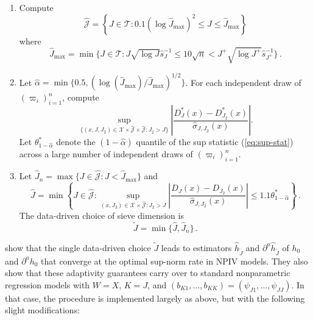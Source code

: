 \documentclass[
]{jss}
\begin{document}
\begin{enumerate}
\item Compute 
\begin{equation}\label{eq:index_set}
 \hat{\mathcal J}  = \left\{ J \in \mathcal T : 0.1 ( \log \hat J_{\max})^2 \leq J \leq \hat J_{\max}\right\}
\end{equation}
where
\begin{equation} \label{eq:J_hat_max}
 \hat{J}_{\max} = \min \bigg \{ J \in \mathcal T :   J \sqrt{\log J}  \hat{s}_J^{-1}     \leq 10 \sqrt{n}  <  J^{+} \sqrt{\log J^{+}}   \hat{s}_{J^{+}}^{-1}  \bigg \} \,.
\end{equation}
\item Let $\hat \alpha = \min\{ 0.5 , (\log(\hat{J}_{\max})/\hat{J}_{\max})^{1/2}\}$.  For each independent draw of $(\varpi_i)_{i=1}^n$, compute
\begin{equation}\label{eq:sup-stat}
 \sup_{\{ (x,J,J_2) \in \mathcal{X} \times \hat{\mathcal J} \times \hat{\mathcal J} : J_2 > J \}} \left| \frac{D_{J}^*(x)-D_{J_2}^*(x)}{\hat \sigma_{J,J_2}(x)} \right|.
\end{equation}
Let $\theta^*_{1-\hat \alpha}$ denote the $(1- \hat \alpha )$ quantile of the sup statistic (\ref{eq:sup-stat}) across a large number  of independent draws of $(\varpi_i)_{i=1}^n$.
\item Let $\hat J_n = \max\{J \in \hat{\mathcal J} : J < \hat J_{\max}\}$ and
\begin{equation}\label{eq:J_lepski}
 \hat{J} = \min \left \{ J \in \hat{\mathcal J} : \sup_{(x, J_2) \in \mathcal{X} \times \hat{\mathcal{J}} : J_2 > J } \left| \frac{D_{J}(x)-D_{J_2}(x)}{\hat \sigma_{J,J_2}(x)} \right| \leq 1.1 \theta^*_{1 - \hat \alpha} \right \} \,.
\end{equation}
The data-driven choice of sieve dimension is
\begin{equation} \label{eq:J-choice}
 \tilde{J} = \min\{\hat{J},\hat J_n\}\,.
\end{equation}
\end{enumerate}

\citet{CCK} show that the single data-driven choice \(\tilde J\) leads
to estimators \(\hat h_{\tilde J}\) and \(\partial^a \hat h_{\tilde J}\)
of \(h_0\) and \(\partial^a h_0\) that converge at the optimal sup-norm
rate in NPIV models. They also show that these adaptivity guarantees
carry over to standard nonparametric regression models with \(W = X\),
\(K = J\), and
\((b_{K1},\ldots,b_{KK}) = (\psi_{J1},\ldots,\psi_{JJ})\). In that case,
the procedure is implemented largely as above, but with the following
slight modifications:
\end{document}
